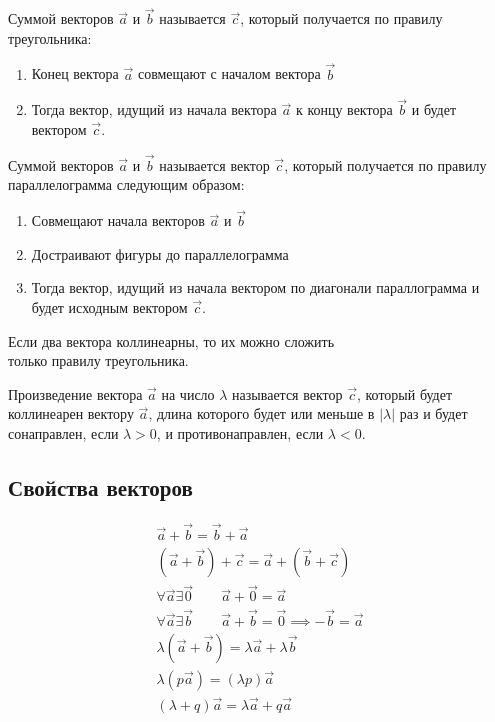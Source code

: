 \begin{definition}
  Суммой векторов $\vec{a}$ и $\vec{b}$ называется $\vec{c}$, который получается по правилу треугольника:
  \begin{enumerate}
    \item Конец вектора $\vec{a}$ совмещают с началом вектора $\vec{b}$
    \item Тогда вектор, идущий из начала вектора $\vec{a}$ к концу вектора $\vec{b}$ и будет вектором $\vec{c}$.
  \end{enumerate}
\end{definition}

\begin{definition}
  Суммой векторов $\vec{a}$ и $\vec{b}$ называется вектор $\vec{c}$, который получается по правилу параллелограмма следующим образом:
  \begin{enumerate}
    \item Совмещают начала векторов $\vec{a}$ и $\vec{b}$
    \item Достраивают фигуры до параллелограмма
    \item Тогда вектор, идущий из начала вектором по диагонали параллограмма и будет исходным вектором $\vec{c}$.
  \end{enumerate}
\end{definition}

\begin{note}
  Если два вектора коллинеарны, то их можно сложить \\ только правилу треугольника.
\end{note}

\begin{definition}
  Произведение вектора $\vec{a}$ на число $\lambda$ называется вектор $\vec{c}$, который будет коллинеарен вектору $\vec{a}$, длина которого будет или меньше в $|\lambda|$ раз и будет сонаправлен, если $\lambda > 0$, и противонаправлен, если $\lambda < 0$.
\end{definition}

\subsection{Свойства векторов}
\begin{gather}
  \vec{a} + \vec{b} = \vec{b} + \vec{a} \\
  (\vec{a} + \vec{b}) + \vec{c} = \vec{a} + (\vec{b} + \vec{c}) \\
  \forall \vec{a} \exists \vec{0} \qquad \vec{a} + \vec{0} = \vec{a} \\
  \forall \vec{a} \exists \vec{b} \qquad \vec{a} + \vec{b} = \vec{0} \implies -\vec{b} = \vec{a} \\
  \lambda\left( \vec{a} + \vec{b} \right) = \lambda \vec{a} + \lambda \vec{b} \\
  \lambda(p \vec{a}) = \left( \lambda p \right) \vec{a} \\
  \left( \lambda  + q\right) \vec{a} = \lambda \vec{a} + q \vec{a}
\end{gather}

